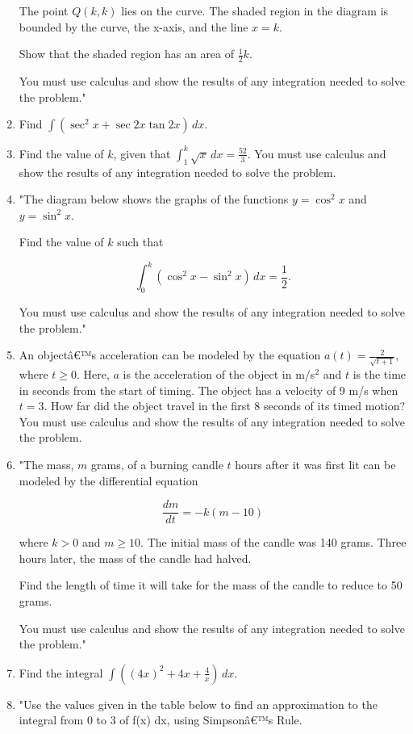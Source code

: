 \documentclass{article}
\begin{document}
\begin{enumerate}
The point \( Q(k, k) \) lies on the curve.  
The shaded region in the diagram is bounded by the curve, the x-axis, and the line \( x = k \).

Show that the shaded region has an area of \( \frac{1}{2} k \).

You must use calculus and show the results of any integration needed to solve the problem."
\vspace{3cm}
\item Find \(\int (\sec^2 x + \sec 2x \tan 2x) \, dx\).
\vspace{3cm}
\item Find the value of \( k \), given that \(\int_1^k \sqrt{x} \, dx = \frac{52}{3}\). You must use calculus and show the results of any integration needed to solve the problem.
\vspace{3cm}
\item "The diagram below shows the graphs of the functions \( y = \cos^2 x \) and \( y = \sin^2 x \).

Find the value of \( k \) such that

\[
\int_{0}^{k} (\cos^2 x - \sin^2 x) \, dx = \frac{1}{2}.
\]

You must use calculus and show the results of any integration needed to solve the problem."
\vspace{3cm}
\item An objectâ€™s acceleration can be modeled by the equation \( a(t) = \frac{2}{\sqrt{t+1}} \), where \( t \geq 0 \). Here, \( a \) is the acceleration of the object in m/s\(^2\) and \( t \) is the time in seconds from the start of timing. The object has a velocity of 9 m/s when \( t = 3 \). How far did the object travel in the first 8 seconds of its timed motion? You must use calculus and show the results of any integration needed to solve the problem.
\vspace{3cm}
\item "The mass, \( m \) grams, of a burning candle \( t \) hours after it was first lit can be modeled by the differential equation

\[ \frac{dm}{dt} = -k(m - 10) \]

where \( k > 0 \) and \( m \geq 10 \). The initial mass of the candle was 140 grams. Three hours later, the mass of the candle had halved.

Find the length of time it will take for the mass of the candle to reduce to 50 grams.

You must use calculus and show the results of any integration needed to solve the problem."
\vspace{3cm}
\item Find the integral \(\int \left( (4x)^2 + 4x + \frac{4}{x} \right) \, dx\).
\vspace{3cm}
\item "Use the values given in the table below to find an approximation to the integral from 0 to 3 of f(x) dx, using Simpsonâ€™s Rule.


\end{enumerate}
\end{document}

